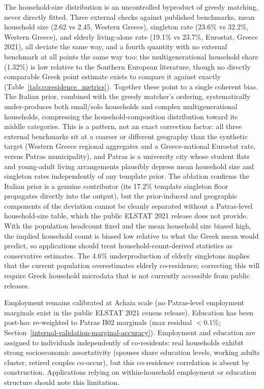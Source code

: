\documentclass{article}
\begin{document}
The household-size distribution is an uncontrolled byproduct of greedy matching, never directly fitted. Three external checks against published benchmarks, mean household size (2.62 vs 2.45, Western Greece), singleton rate (23.6\% vs 32.2\%, Western Greece), and elderly living-alone rate (19.1\% vs 23.7\%, Eurostat, Greece 2021), all deviate the same way, and a fourth quantity with no external benchmark at all points the same way too: the multigenerational household share (1.32\%) is low relative to the Southern European literature, though no directly comparable Greek point estimate exists to compare it against exactly (Table~\ref{tab:coresidence_metrics}). Together these point to a single coherent bias. The Italian prior, combined with the greedy matcher's ordering, systematically under-produces both small/solo households and complex multigenerational households, compressing the household-composition distribution toward its middle categories. This is a pattern, not an exact correction factor: all three external benchmarks sit at a coarser or different geography than the synthetic target (Western Greece regional aggregates and a Greece-national Eurostat rate, versus Patras municipality), and Patras is a university city whose student flats and young-adult living arrangements plausibly depress mean household size and singleton rates independently of any template prior. The ablation confirms the Italian prior is a genuine contributor (its 17.2\% template singleton floor propagates directly into the output), but the prior-induced and geographic components of the deviation cannot be cleanly separated without a Patras-level household-size table, which the public ELSTAT 2021 release does not provide. With the population headcount fixed and the mean household size biased high, the implied household count is biased low relative to what the Greek mean would predict, so applications should treat household-count-derived statistics as conservative estimates. The 4.6\% underproduction of elderly singletons implies that the current population overestimates elderly co-residence; correcting this will require Greek household microdata that is not currently accessible from public releases.

Employment remains calibrated at Achaia scale (no Patras-level employment marginals exist in the public ELSTAT 2021 census release). Education has been post-hoc re-weighted to Patras B02 marginals (max residual $<$0.1\%; Section~\ref{internal-validation-marginal-accuracy}). Employment and education are assigned to individuals independently of co-residents: real households exhibit strong socioeconomic assortativity (spouses share education levels, working adults cluster, retired couples co-occur), but this co-residence correlation is absent by construction. Applications relying on within-household employment or education structure should note this limitation.
\end{document}
